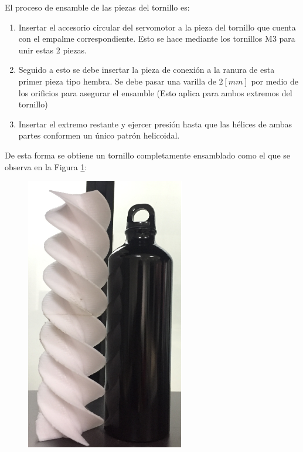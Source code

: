 El proceso de ensamble de las piezas del tornillo es:

\begin{enumerate}[(1)]
    \item Insertar el accesorio circular del servomotor a la pieza del tornillo que cuenta con el empalme correspondiente. Esto se hace mediante los tornillos M3 para unir estas 2 piezas.
    \item Seguido a esto se debe insertar la pieza de conexión a la ranura de esta primer pieza tipo hembra. Se debe pasar una varilla de $2[mm]$ por medio de los orificios para asegurar el ensamble (Esto aplica para ambos extremos del tornillo)
    \item Insertar el extremo restante y ejercer presión hasta que las hélices de ambas partes conformen un único patrón helicoidal.
\end{enumerate}

De esta forma se obtiene un tornillo completamente ensamblado como el que se observa en la Figura \ref{tornitotpng}:

     \begin{figure}[H]
        \centering
        \includegraphics[scale=0.750]{img/tornitot2.png}
        \caption{} \label{tornitotpng}
    \end{figure}

